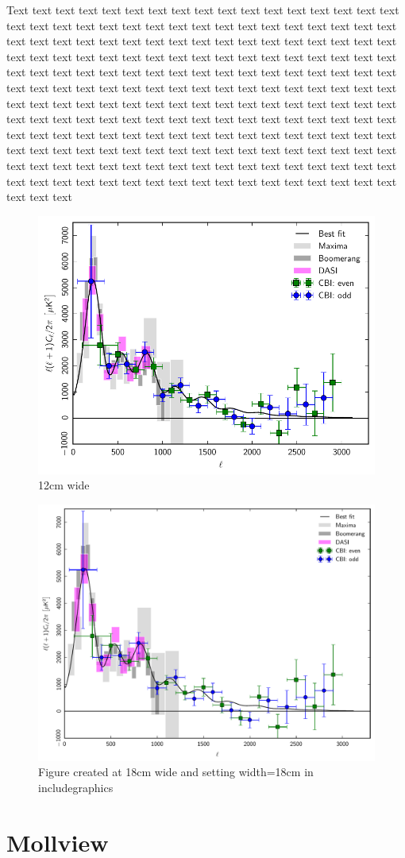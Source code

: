 \documentclass[traditabstract]{aa}
\newcommand{\sometext}{Text text text text text text text text text text text text text text text text text text text text text text text text text text text text text text text text text text text text text text text text text text text text text text text text text text text text text text text text text text text text text text text text text text text text text text text text text text text text text text text text text text text text text text text text text text text text text text text text text text text text text text text text text text text text text text text text text text text text text text text text text text text text text text text text text text text text text text text text text text text text text text text text text text text text text text text text text text text text text text text text text text text text text text text text text text text text text text text text text text text text text text text text text text text text text text text text text text text text text text text text text text text text text text text}
\begin{document}
\sometext

\begin{figure}[h]
\centering
\includegraphics[width=12cm]{powerspectrum_120mm.pdf}
\caption{\label{fig:gainCurve} 12cm wide} 
\end{figure}

\begin{figure}[t]
\centering
\includegraphics[width=18cm]{powerspectrum_180mm.pdf}
\caption{\label{fig:gainCurve} Figure created at 18cm wide and setting  width=18cm in includegraphics}
\end{figure}

\clearpage

\section{Mollview}
\end{document}
